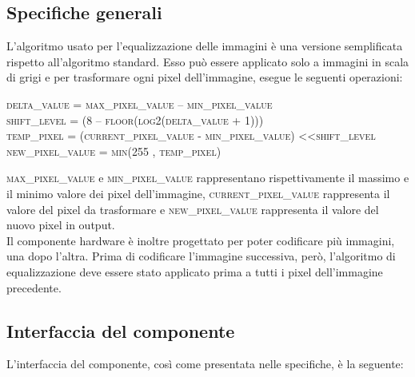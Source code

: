 \documentclass[12pt, table, xcdraw]{article}
\begin{document}
\subsection{Specifiche generali}
L'algoritmo usato per l'equalizzazione delle immagini è una versione semplificata rispetto all'algoritmo standard. Esso può essere applicato solo a immagini in scala di grigi e per trasformare ogni pixel dell'immagine, esegue le seguenti operazioni:

\begin{center}

\textsc{delta\_value = max\_pixel\_value – min\_pixel\_value} \\
\textsc{shift\_level = (8 – floor(log2(delta\_value + 1)))} \\
\textsc{temp\_pixel = (current\_pixel\_value - min\_pixel\_value) \textless\textless  shift\_level} \\
\textsc{new\_pixel\_value = min(255 , temp\_pixel)} \\
\end{center}

\textsc{max\_pixel\_value} e \textsc{min\_pixel\_value} rappresentano rispettivamente il massimo e il minimo valore dei pixel dell'immagine, \textsc{current\_pixel\_value} rappresenta il valore del pixel da trasformare e \textsc{new\_pixel\_value} rappresenta il valore del nuovo pixel in output. \\

Il componente hardware è inoltre progettato per poter codificare più immagini, una dopo l'altra. Prima di codificare l'immagine successiva, però, l'algoritmo di equalizzazione deve essere stato applicato prima a tutti i pixel dell'immagine precedente.

\newpage

\subsection{Interfaccia del componente}
L’interfaccia del componente, così come presentata nelle specifiche, è la seguente:
\end{document}
